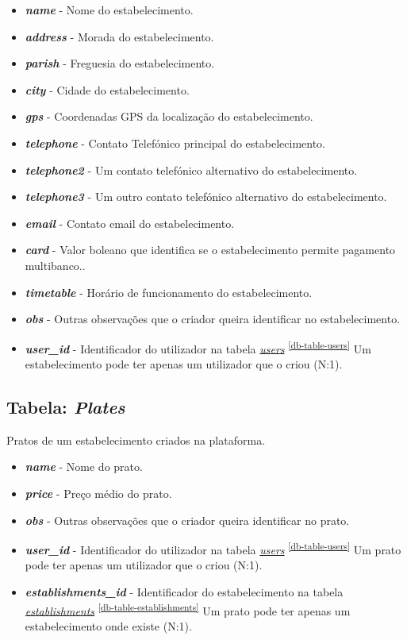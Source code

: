 \documentclass[11pt, a4paper, sans]{article}
\begin{document}
	\begin{itemize}
		\item \textbf{\textit{name}} - Nome do estabelecimento.
		\item \textbf{\textit{address}} - Morada do estabelecimento.
		\item \textbf{\textit{parish}} - Freguesia do estabelecimento.
		\item \textbf{\textit{city}} - Cidade do estabelecimento.
		\item \textbf{\textit{gps}} - Coordenadas GPS da localização do estabelecimento.
		\item \textbf{\textit{telephone}} - Contato Telefónico principal do estabelecimento.
		\item \textbf{\textit{telephone2}} - Um contato telefónico alternativo do estabelecimento.
		\item \textbf{\textit{telephone3}} - Um outro contato telefónico alternativo do estabelecimento.
		\item \textbf{\textit{email}} - Contato email do estabelecimento.
		\item \textbf{\textit{card}} - Valor boleano que identifica se o estabelecimento permite pagamento
			multibanco..
		\item \textbf{\textit{timetable}} - Horário de funcionamento do estabelecimento.
		\item \textbf{\textit{obs}} - Outras observações que o criador queira identificar no estabelecimento.
		\item \textbf{\textit{user\_id}} - Identificador do utilizador na tabela 
			\underline{\textit{users}} \textsuperscript{\ref{db-table-users}} 
			Um estabelecimento pode ter apenas um utilizador que o criou (N:1).
	\end{itemize}

	\subsection{Tabela: \textit{Plates}} \label{db-table-plates}

	Pratos de um estabelecimento criados na plataforma.

	\begin{itemize}
		\item \textbf{\textit{name}} - Nome do prato.
		\item \textbf{\textit{price}} - Preço médio do prato.
		\item \textbf{\textit{obs}} - Outras observações que o criador queira identificar no prato.
		\item \textbf{\textit{user\_id}} - Identificador do utilizador na tabela 
			\underline{\textit{users}} \textsuperscript{\ref{db-table-users}} 
			Um prato pode ter apenas um utilizador que o criou (N:1).
		\item \textbf{\textit{establishments\_id}} - Identificador do estabelecimento na tabela 
			\underline{\textit{establishments}} \textsuperscript{\ref{db-table-establishments}} 
			Um prato pode ter apenas um estabelecimento onde existe (N:1).
	\end{itemize}
\end{document}
